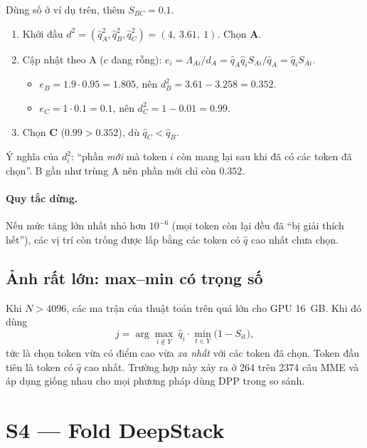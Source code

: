 \documentclass[11pt,a4paper]{article}
\newcommand{\qhat}{\hat{q}}
\begin{document}
\begin{vidu}[: ba token A, B, C, chọn $K=2$]
Dùng số ở ví dụ trên, thêm $S_{BC}=0.1$.
\begin{enumerate}
\item Khởi đầu $d^2=(\qhat_A^2,\qhat_B^2,\qhat_C^2)=(4,\ 3.61,\ 1)$. Chọn \textbf{A}.
\item Cập nhật theo A ($c$ đang rỗng): $e_i=\Lambda_{Ai}/d_A=\qhat_A\qhat_iS_{Ai}/\qhat_A=\qhat_iS_{Ai}$.
  \begin{itemize}
  \item $e_B=1.9\cdot0.95=1.805$, nên $d_B^2=3.61-3.258=0.352$.
  \item $e_C=1\cdot0.1=0.1$, nên $d_C^2=1-0.01=0.99$.
  \end{itemize}
\item Chọn \textbf{C} ($0.99>0.352$), dù $\qhat_C<\qhat_B$.
\end{enumerate}
Ý nghĩa của $d_i^2$: ``phần \emph{mới} mà token $i$ còn mang lại sau khi đã có các token đã chọn''. B gần như trùng A nên phần mới chỉ còn $0.352$.
\end{vidu}

\paragraph{Quy tắc dừng.} Nếu mức tăng lớn nhất nhỏ hơn $10^{-6}$ (mọi token còn lại đều đã ``bị giải thích hết''), các vị trí còn trống được lấp bằng các token có $\qhat$ cao nhất chưa chọn.

\subsection{Ảnh rất lớn: max--min có trọng số}
Khi $N>4096$, các ma trận của thuật toán trên quá lớn cho GPU 16~GB. Khi đó dùng
\begin{equation}
j=\arg\max_{i\notin Y}\ \qhat_i\cdot\min_{t\in Y}\big(1-S_{it}\big),
\end{equation}
tức là chọn token vừa có điểm cao vừa \emph{xa nhất} với các token đã chọn. Token đầu tiên là token có $\qhat$ cao nhất. Trường hợp này xảy ra ở 264 trên 2374 câu MME và áp dụng giống nhau cho mọi phương pháp dùng DPP trong so sánh.

\section{S4 --- Fold DeepStack}
\label{sec:fold}
\end{document}

